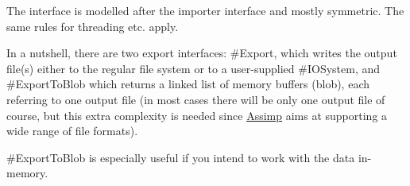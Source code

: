 The interface is modelled after the importer interface and mostly symmetric. The same rules for threading etc. apply.

In a nutshell, there are two export interfaces\-: \#\-Export, which writes the output file(s) either to the regular file system or to a user-\/supplied \#\-I\-O\-System, and \#\-Export\-To\-Blob which returns a linked list of memory buffers (blob), each referring to one output file (in most cases there will be only one output file of course, but this extra complexity is needed since \hyperlink{namespace_assimp}{Assimp} aims at supporting a wide range of file formats).

\#\-Export\-To\-Blob is especially useful if you intend to work with the data in-\/memory. 